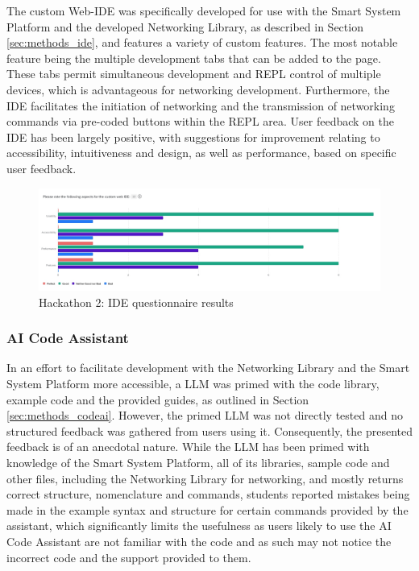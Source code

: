 The custom Web-IDE was specifically developed for use with the Smart System Platform and the developed Networking Library, as described in Section \ref{sec:methods_ide}, and features a variety of custom features. The most notable feature being the multiple development tabs that can be added to the page. These tabs permit simultaneous development and REPL control of multiple devices, which is advantageous for networking development. Furthermore, the IDE facilitates the initiation of networking and the transmission of networking commands via pre-coded buttons within the REPL area. User feedback on the IDE has been largely positive, with suggestions for improvement relating to accessibility, intuitiveness and design, as well as performance, based on specific user feedback.

\begin{figure}[H]
    \centering
    \includegraphics[width=\linewidth]{overleaf/images/ide_rating.jpg}
    \vspace{\ftspace}
    \caption{Hackathon 2: IDE questionnaire results}
    \vspace{\ftspace}
    \label{fig:website}
\end{figure}

\subsubsection{\label{sec:res_ai_code}AI Code Assistant}
In an effort to facilitate development with the Networking Library and the Smart System Platform more accessible, a LLM was primed with the code library, example code and the provided guides, as outlined in Section \ref{sec:methods_codeai}. However, the primed LLM was not directly tested and no structured feedback was gathered from users using it. Consequently, the presented feedback is of an anecdotal nature. While the LLM has been primed with knowledge of the Smart System Platform, all of its libraries, sample code and other files, including the Networking Library for networking, and mostly returns correct structure, nomenclature and commands, students reported mistakes being made in the example syntax and structure for certain commands provided by the assistant, which significantly limits the usefulness as users likely to use the AI Code Assistant are not familiar with the code and as such may not notice the incorrect code and the support provided to them.

